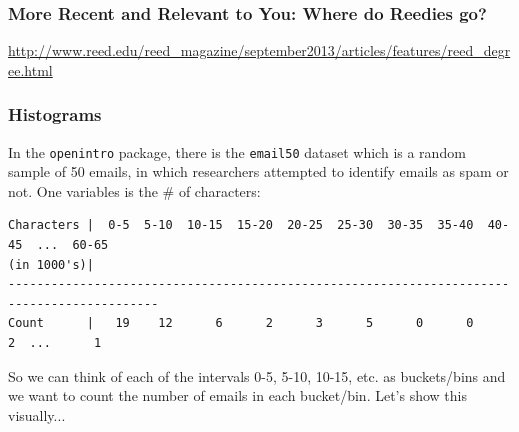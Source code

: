 \documentclass[handout]{beamer}
\newcommand{\blue}[1]{\textcolor{blue2}{#1}}
\begin{document}
\begin{frame}
\frametitle{More Recent and Relevant to You: Where do Reedies go?}

\blue{\url{http://www.reed.edu/reed_magazine/september2013/articles/features/reed_degree.html}}

\end{frame}


\begin{frame}[fragile]
\frametitle{Histograms}
In the {\tt openintro} package, there is the {\tt email50} dataset which is a random sample of 50 emails, in which researchers attempted to identify emails as spam or not.  One variables is the \# of characters:

\vspace{0.25cm}

\begin{tiny}
\begin{verbatim}
Characters |  0-5  5-10  10-15  15-20  20-25  25-30  30-35  35-40  40-45  ...  60-65
(in 1000's)|
-------------------------------------------------------------------------------------------
Count      |   19    12      6      2      3      5      0      0      2  ...      1
\end{verbatim}
\end{tiny}

\vspace{0.25cm}

\pause So we can think of each of the intervals 0-5, 5-10, 10-15, etc. as \blue{buckets/bins} and we want to count the number of emails in each bucket/bin.  Let's show this visually...

\end{frame}
\end{document}
